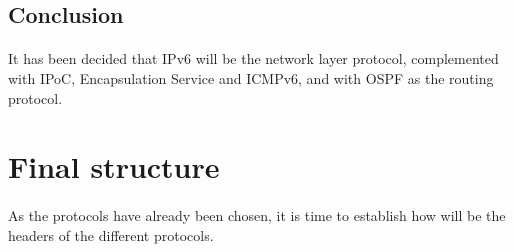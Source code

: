 \documentclass[12pt,a4paper]{report}
\begin{document}
\subsection{Conclusion}
\paragraph{}It has been decided that IPv6 will be the network layer protocol, complemented with IPoC, Encapsulation Service and ICMPv6, and with OSPF as the routing protocol.

\section{Final structure}
\paragraph{}As the protocols have already been chosen, it is time to establish how will be the headers of the different protocols.
\end{document}
